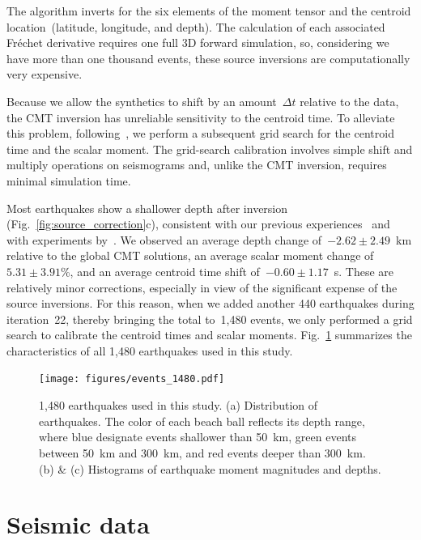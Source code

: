 \documentclass[extra,mreferee]{gji}
\begin{document}
The algorithm inverts for the six elements of the moment tensor
and the centroid location~(latitude, longitude, and depth).
The calculation of each associated Fr\'echet derivative requires one full 3D forward simulation,
so, considering we have more than one thousand events,
these source inversions are computationally very expensive.

Because we allow the synthetics to shift by an amount~$\Delta t$ relative to the data,
the CMT inversion has unreliable sensitivity to the centroid time.
To alleviate this problem,
following~\cite{zhu2012structure},
we perform a subsequent grid search for the centroid time and the scalar moment.
The grid-search calibration involves simple shift and multiply operations on seismograms
and, unlike the CMT inversion, requires minimal simulation time.

Most earthquakes show a shallower depth after inversion
(Fig.~\ref{fig:source_correction}c),
consistent with our previous experiences~\citep[e.g.,][]{zhu2015seismic,chen2015multiparameter,bozdaug2016global} and with experiments by~\cite{hjorleifsdottir2010effects}.
We observed an average depth change of~$-2.62\pm2.49$~km relative to the global CMT solutions,
an average scalar moment change of~$5.31\pm3.91$\%,
and an average centroid time shift of~$-0.60\pm1.17$~s.
These are relatively minor corrections, especially in view of the significant expense of the source inversions.
For this reason, when we added another 440 earthquakes during iteration~22,
thereby bringing the total to~1,480 events,
we only performed a grid search to calibrate the centroid times and scalar moments.
Fig.~\ref{fig:event_1480} summarizes the characteristics of all 1,480 earthquakes used in this study.

\begin{figure}
  \centering
  \texttt{[image: figures/events\_1480.pdf]}
  \caption{1,480 earthquakes used in this study. (a) Distribution of earthquakes. The color of each beach ball reflects its depth range, where blue designate events shallower than 50~km, green events between 50~km and 300~km, and red events deeper than 300~km. (b) \& (c) Histograms of earthquake moment magnitudes and depths.}
  \label{fig:event_1480}
\end{figure}


\section{Seismic data}
\label{section:data}
\end{document}
